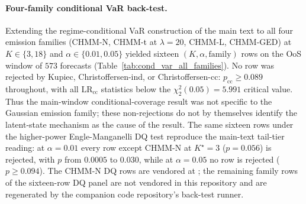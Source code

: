 \paragraph{Four-family conditional VaR back-test.}
Extending the regime-conditional VaR construction of the main text to all four emission families (CHMM-N, CHMM-t at $\lambda = 20$, CHMM-L, CHMM-GED) at $K \in \{3, 18\}$ and $\alpha \in \{0.01, 0.05\}$ yielded sixteen $(K, \alpha, \text{family})$ rows on the OoS window of $573$ forecasts (Table~\ref{tab:cond_var_all_families}). No row was rejected by Kupiec, Christoffersen-ind, or Christoffersen-cc: $p_{\text{cc}} \ge 0.089$ throughout, with all $\text{LR}_{\text{cc}}$ statistics below the $\chi^2_2(0.05) = 5.991$ critical value. Thus the main-window conditional-coverage result was not specific to the Gaussian emission family; these non-rejections do not by themselves identify the latent-state mechanism as the cause of the result. The same sixteen rows under the higher-power Engle-Manganelli DQ test reproduce the main-text tail-tier reading: at $\alpha = 0.01$ every row except CHMM-N at $K^\star = 3$ ($p = 0.056$) is rejected, with $p$ from $0.0005$ to $0.030$, while at $\alpha = 0.05$ no row is rejected ($p \ge 0.094$). The CHMM-N DQ rows are vendored at ; the remaining family rows of the sixteen-row DQ panel are not vendored in this repository and are regenerated by the companion code repository's back-test runner.

